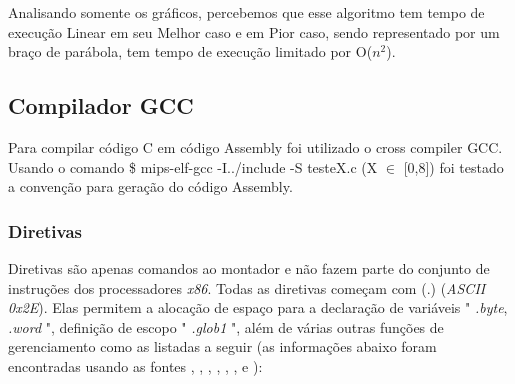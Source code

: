 \documentclass[12pt]{article}
\begin{document}
Analisando somente os gráficos, percebemos que esse algoritmo tem tempo de execução Linear em seu Melhor caso e em Pior caso, sendo representado por um braço de parábola, tem tempo de execução limitado por O(\(n^2\)). 

\subsection{Compilador GCC}
\label{subsec:comp}

Para compilar código C em código Assembly foi utilizado o cross compiler \cite{MIPS} GCC. Usando o comando \$ mips-elf-gcc -I../include -S testeX.c (X $\in$ [0,8]) foi testado a convenção para geração do código Assembly.

\subsubsection{Diretivas}
\label{subsubsec:diretivas}

Diretivas são apenas comandos ao montador e não fazem parte do conjunto de instruções dos processadores \textit{x86}. Todas as diretivas começam com (.) (\textit{ASCII 0x2E}). Elas permitem a alocação de espaço para a declaração de variáveis " \textit{.byte}, \textit{.word} ", definição de escopo " \textit{.glob1} ", além de várias outras funções de gerenciamento como as listadas a seguir (as informações abaixo foram encontradas usando as fontes \cite{mips1}, \cite{mips2-1}, \cite{mips2-2}, \cite{mips2-3}, \cite{mips3},
\cite{mips4}, \cite{mips5} e \cite{mips6} ):
\end{document}
